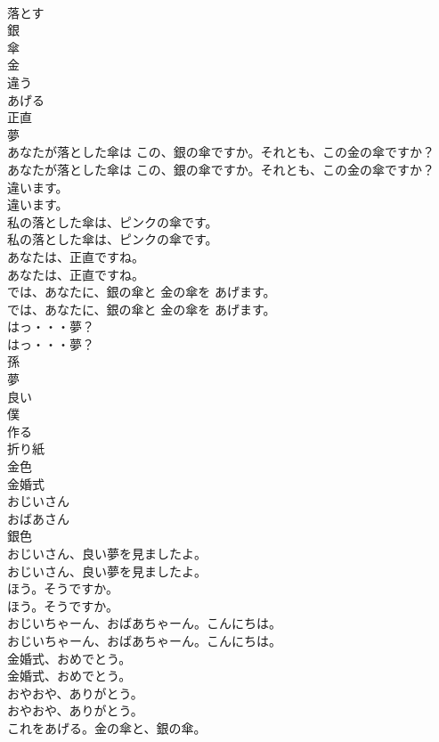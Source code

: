 \documentclass[8pt]{extreport}
\begin{document}
\begin{CJK}{UTF8}{min}
\\	落とす
\\	銀
\\	傘
\\	金
\\	違う
\\	あげる
\\	正直
\\	夢
\\	あなたが落とした傘は この、銀の傘ですか。それとも、この金の傘ですか？	
\\	あなたが落とした傘は この、銀の傘ですか。それとも、この金の傘ですか？ 
\\	違います。	
\\	違います。 
\\	私の落とした傘は、ピンクの傘です。	
\\	私の落とした傘は、ピンクの傘です。 
\\	あなたは、正直ですね。	
\\	あなたは、正直ですね。 
\\	では、あなたに、銀の傘と 金の傘を あげます。	
\\	では、あなたに、銀の傘と 金の傘を あげます。 
\\	はっ・・・夢？	
\\	はっ・・・夢？ 
\\	孫
\\	夢
\\	良い
\\	僕
\\	作る
\\	折り紙
\\	金色
\\	金婚式
\\	おじいさん
\\	おばあさん
\\	銀色
\\	おじいさん、良い夢を見ましたよ。	
\\	おじいさん、良い夢を見ましたよ。 
\\	ほう。そうですか。	
\\	ほう。そうですか。 
\\	おじいちゃーん、おばあちゃーん。こんにちは。	
\\	おじいちゃーん、おばあちゃーん。こんにちは。 
\\	金婚式、おめでとう。	
\\	金婚式、おめでとう。 
\\	おやおや、ありがとう。	
\\	おやおや、ありがとう。 
\\	これをあげる。金の傘と、銀の傘。	

\end{CJK}
\end{document}
